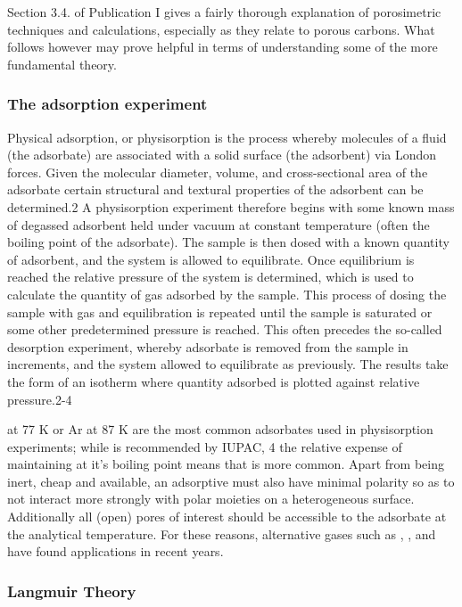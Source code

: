Section 3.4. of Publication I gives a fairly thorough explanation of porosimetric techniques and calculations, especially as they relate to porous carbons. What follows however may prove helpful in terms of understanding some of the more fundamental theory. 

\subsubsection{The adsorption experiment}
Physical adsorption, or physisorption is the process whereby molecules of a fluid (the adsorbate) are associated with a solid surface (the adsorbent) via London forces. Given the molecular diameter, volume, and cross-sectional area of the adsorbate
certain structural and textural properties of the adsorbent can be determined.2 A physisorption experiment therefore begins with some known mass of degassed adsorbent held under vacuum at constant temperature (often the boiling point of the adsorbate). The sample is then dosed with a known quantity of adsorbent, and the system is allowed to equilibrate. Once equilibrium is reached the relative pressure of the system is determined, which is used to calculate the quantity of gas adsorbed by the sample. This process of dosing the sample with gas and equilibration is repeated until the sample is saturated or some other predetermined pressure is reached. This often precedes the so-called desorption experiment, whereby adsorbate is removed from the sample in increments, and the system allowed to equilibrate as previously. The results take the form of an isotherm where quantity adsorbed is plotted against
relative pressure.2-4

 at 77 K or Ar at 87 K are the most common adsorbates used in physisorption experiments; while  is recommended by IUPAC, 4 the relative expense of maintaining  at it's boiling point means that  is more common. Apart from being inert, cheap and available, an adsorptive must also have minimal polarity so as to not interact more strongly with polar moieties on a heterogeneous surface. Additionally all (open) pores of interest should be accessible to the adsorbate at the analytical temperature. For these reasons, alternative gases such as , , and  have found applications in recent years.

\subsubsection{Langmuir Theory}

